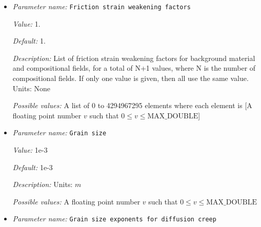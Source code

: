\begin{itemize}
{\it Value:} 1.


{\it Default:} 1.


{\it Description:} List of strain weakening interval final strains for the diffusion and dislocation prefactor parameters of the background material and compositional fields, for a total of N+1 values, where N is the number of compositional fields. If only one value is given, then all use the same value.  Units: None


{\it Possible values:} A list of 0 to 4294967295 elements where each element is [A floating point number $v$ such that $0 \leq v \leq \text{MAX\_DOUBLE}$]
\item {\it Parameter name:} {\tt Friction strain weakening factors}
\label{parameters:Material model/Visco Plastic/Friction strain weakening factors}
\label{parameters:Material_20model/Visco_20Plastic/Friction_20strain_20weakening_20factors}


{\it Value:} 1.


{\it Default:} 1.


{\it Description:} List of friction strain weakening factors for background material and compositional fields, for a total of N+1 values, where N is the number of compositional fields. If only one value is given, then all use the same value.  Units: None


{\it Possible values:} A list of 0 to 4294967295 elements where each element is [A floating point number $v$ such that $0 \leq v \leq \text{MAX\_DOUBLE}$]
\item {\it Parameter name:} {\tt Grain size}
\label{parameters:Material model/Visco Plastic/Grain size}
\label{parameters:Material_20model/Visco_20Plastic/Grain_20size}


{\it Value:} 1e-3


{\it Default:} 1e-3


{\it Description:} Units: $m$


{\it Possible values:} A floating point number $v$ such that $0 \leq v \leq \text{MAX\_DOUBLE}$
\item {\it Parameter name:} {\tt Grain size exponents for diffusion creep}
\label{parameters:Material model/Visco Plastic/Grain size exponents for diffusion creep}
\label{parameters:Material_20model/Visco_20Plastic/Grain_20size_20exponents_20for_20diffusion_20creep}



\end{itemize}
